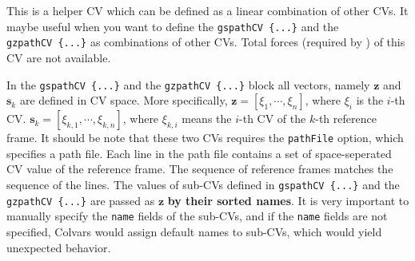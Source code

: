 
This is a helper CV which can be defined as a linear combination of other CVs. It maybe useful when you want to define the \texttt{gspathCV~\{...\}} and the \texttt{gzpathCV~\{...\}} as combinations of other CVs. Total forces (required by ) of this CV are not available.




In the \texttt{gspathCV~\{...\}} and the \texttt{gzpathCV~\{...\}} block all vectors, namely $\mathbf{z}$ and $\mathbf{s}_{k}$ are defined in CV space.  More specifically, $\mathbf{z} = \left[{\xi}_{1}, \cdots, {\xi}_{n}\right]$, where ${\xi}_{i}$ is the $i$-th CV. $\mathbf{s}_{k} = \left[{\xi}_{k,1}, \cdots, {\xi}_{k,n}\right]$, where ${\xi}_{k,i}$ means the $i$-th CV of the $k$-th reference frame. It should be note that these two CVs requires the \texttt{pathFile} option, which specifies a path file. Each line in the path file contains a set of space-seperated CV value of the reference frame. The sequence of reference frames matches the sequence of the lines. The values of sub-CVs defined in \texttt{gspathCV~\{...\}} and the \texttt{gzpathCV~\{...\}} are passed as $\mathbf{z}$ \textbf{by their sorted names}. It is very important to manually specify the \texttt{name} fields of the sub-CVs, and if the \texttt{name} fields are not specified, Colvars would assign default names to sub-CVs, which would yield unexpected behavior.


